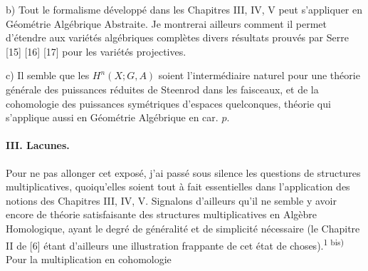 \par b)
Tout le formalisme développé dans les Chapitres III, IV, V peut s'appliquer en
Géométrie Algébrique Abstraite. Je montrerai ailleurs comment il permet
d'étendre aux variétés algébriques complètes divers résultats prouvés par
Serre [15] [16] [17] pour les variétés projectives.

\par c)
Il semble que les $H^n(X;G,A)$ soient l'intermédiaire naturel pour une théorie
générale des puissances réduites de Steenrod dans les faisceaux, et de la
cohomologie des puissances symétriques d'espaces quelconques, théorie qui
s'applique aussi en Géométrie Algébrique en car. $p$.

\paragraph{III. Lacunes.}
Pour ne pas allonger cet exposé, j'ai passé sous silence les questions de
structures multiplicatives, quoiqu'elles soient tout à fait essentielles dans
l'application des notions des Chapitres III, IV, V. Signalons d'ailleurs qu'il
ne semble y avoir encore de théorie satisfaisante des structures
multiplicatives en Algèbre Homologique, ayant le degré de généralité et de
simplicité nécessaire (le Chapitre II de [6] étant d'ailleurs une illustration
frappante de cet état de choses).\textsuperscript{1 bis)} Pour la multiplication
en cohomologie

